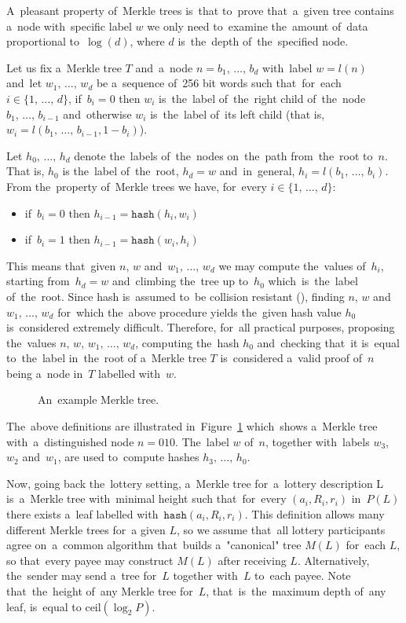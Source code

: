 \documentclass[a4paper]{article}
\newcommand{\hash}[1]{\mathtt{hash}({#1})}
\begin{document}
    A~pleasant property of~Merkle trees is~that to~prove that~a~given tree contains a~node with~specific label $w$
    we only need to~examine the~amount of~data proportional to~$\log(d)$, where $d$ is~the~depth of~the~specified node.

    Let us fix a~Merkle tree $T$ and~a~node $n = b_1,\,\ldots,\,b_d$ with~label $w = l(n)$ and~let $w_1,\,\ldots,\,w_d$
    be a~sequence of~256 bit words such that~for~each $i \in \{1,\,\ldots,\,d\}$, if~$b_i = 0$ then $w_i$ is~the~label
    of~the~right child of~the~node $b_1,\,\ldots,\, b_{i-1}$ and~otherwise $w_i$ is~the~label of~its left child
    (that is, $w_i = l(b_1, \,\ldots,\,b_{i-1}, 1 - b_i)$).

    Let $h_0,\,\ldots,\, h_d$ denote the~labels of~the~nodes on~the~path from~the~root to~$n$. That is, $h_0$ is
    the~label of~the~root, $h_d = w$ and~in~general, $h_i = l(b_1,\,\ldots,\,b_i)$. From the~property of~Merkle trees
    we have, for~every $i \in \{1,\,\ldots,\,d\}$:
    \begin{itemize}
        \item if~$b_i = 0$ then $h_{i-1} = \hash{h_i, w_i}$
        \item if~$b_i = 1$ then $h_{i-1} = \hash{w_i, h_i}$
    \end{itemize}
    This means that~given $n,\, w$ and~$w_1,\,\ldots,\,w_d$ we may compute the~values of~$h_i$, starting from~$h_d = w$
    and~climbing the~tree up to~$h_0$ which~is~the~label of~the~root. Since hash is~assumed to~be collision resistant
    (\cite{SHA3}), finding $n$, $w$ and~$w_1,\,\ldots,\,w_d$ for~which the~above procedure yields the~given
    hash value $h_0$ is~considered extremely difficult. Therefore, for~all practical purposes, proposing the~values
    $n,\,w,\,w_1,\,\ldots,\,w_d$, computing the~hash $h_0$ and~checking that~it is~equal to~the~label in~the~root of
    a~Merkle tree $T$ is~considered a~valid proof of~$n$ being a~node in~$T$ labelled with~$w$.

    \begin{figure}
        
        \caption{An~example Merkle tree.}
        \label{fig:merkle}
    \end{figure}

    The~above definitions are illustrated in~Figure~\ref{fig:merkle} which~shows a~Merkle tree with~a~distinguished
    node $n = 010$. The~label $w$ of~$n$, together with~labels $w_3$, $w_2$ and~$w_1$, are used to~compute hashes
    $h_3, \,\ldots, \,h_0$.


    Now, going back the~lottery setting, a~Merkle tree for~a~lottery description L is~a~Merkle tree with~minimal height
    such that~for~every $(a_i, R_i, r_i)$ in~$P(L)$ there exists a~leaf labelled with~$\hash{a_i, R_i, r_i}$.
    This definition allows many different Merkle trees for~a given $L$, so we assume that~all lottery participants
    agree on~a~common algorithm that~builds a~"canonical" tree $M(L)$ for~each $L$, so that~every payee may construct
    $M(L)$ after receiving $L$. Alternatively, the~sender may send a~tree for~$L$ together with~$L$ to~each payee.
    Note that~the~height of~any Merkle tree for~$L$, that~is~the~maximum depth of~any leaf, is~equal to
    $\text{ceil}(\log_2 P)$.
\end{document}
